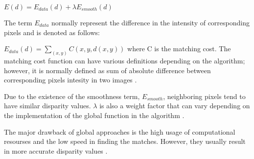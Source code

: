 \documentclass[dvips,letterpaper,12pt]{report}
\begin{document}
\begin{center}
$E(d)=E_{data}(d)+\lambda E_{smooth}(d)$
\end{center}
The term $E_{data}$ normally represent the difference in the intensity of corresponding pixels and is denoted as follows:
\begin{center}
$E_{data}(d) = \sum_{(x,y)}C(x,y,d(x,y))$
where C is the matching cost. The matching cost function can have various definitions depending on the algorithm; however, it is normally defined as sum of absolute difference 
between corresponding pixels intesity in two images \cite{sch02}.

Due to the existence of the smoothness term, $E_{smooth}$, neighboring pixels tend to have similar disparity values. $\lambda$ is also a weight factor that can vary depending 
on the implementation of the global function in the algorithm \cite{sze11}.

\end{center}

The major drawback of global approaches is the high usage of computational resourses and the low speed in finding the matches. However, they usually result in more accurate disparity values
\cite{hirsch02,sze11}. 




 
\end{document}
